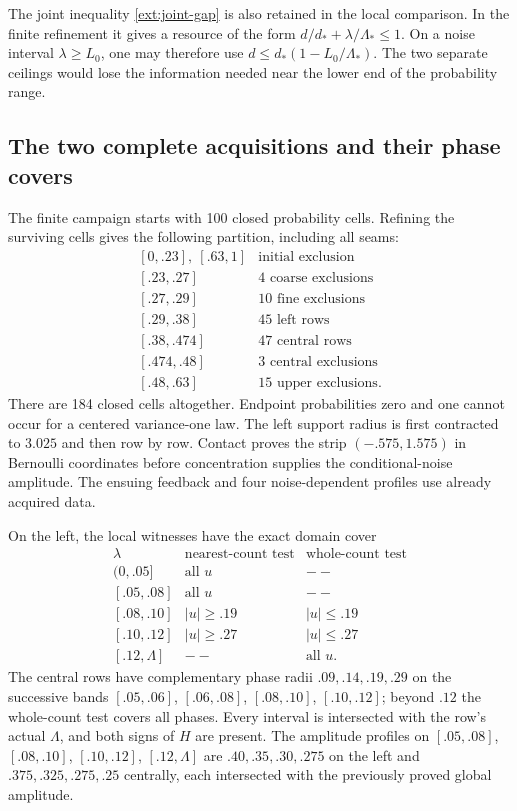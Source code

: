 The joint inequality \eqref{ext:joint-gap} is also retained in the local
comparison. In the finite refinement it gives a resource of the form
$d/d_*+\lambda/\Lambda_*\le1$. On a noise interval
$\lambda\ge L_0$, one may therefore use
$d\le d_*(1-L_0/\Lambda_*)$. The two separate ceilings would lose
the information needed near the lower end of the probability range.

\subsection{The two complete acquisitions and their phase covers}

The finite campaign starts with 100 closed probability cells. Refining
the surviving cells gives the following partition, including all seams:
\[
\begin{array}{c|c}
 {[0,.23],\ [.63,1]}&\text{initial exclusion}\\
 {[.23,.27]}&4\text{ coarse exclusions}\\
 {[.27,.29]}&10\text{ fine exclusions}\\
 {[.29,.38]}&45\text{ left rows}\\
 {[.38,.474]}&47\text{ central rows}\\
 {[.474,.48]}&3\text{ central exclusions}\\
 {[.48,.63]}&15\text{ upper exclusions}.
\end{array}
\]
There are 184 closed cells altogether. Endpoint probabilities zero and
one cannot occur for a centered variance-one law. The left support
radius is first contracted to $3.025$ and then row by row. Contact
proves the strip $(-.575,1.575)$ in Bernoulli coordinates before
concentration supplies the conditional-noise amplitude. The ensuing
feedback and four noise-dependent profiles use already acquired data.

On the left, the local witnesses have the exact domain cover
\[
\begin{array}{c|c|c}
 \lambda&\text{nearest-count test}&\text{whole-count test}\\
 (0,.05]&\text{all }u&--\\
 {[.05,.08]}&\text{all }u&--\\
 {[.08,.10]}&|u|\ge.19&|u|\le.19\\
 {[.10,.12]}&|u|\ge.27&|u|\le.27\\
 {[.12,\Lambda]}&--&\text{all }u.
\end{array}
\]
The central rows have complementary phase radii $.09,.14,.19,.29$
on the successive bands $[.05,.06]$, $[.06,.08]$, $[.08,.10]$,
$[.10,.12]$; beyond $.12$ the whole-count test covers all phases.
Every interval is intersected with the row's actual $\Lambda$, and
both signs of $H$ are present. The amplitude profiles on
$[.05,.08]$, $[.08,.10]$, $[.10,.12]$, $[.12,\Lambda]$ are
$.40,.35,.30,.275$ on the left and $.375,.325,.275,.25$ centrally,
each intersected with the previously proved global amplitude.

